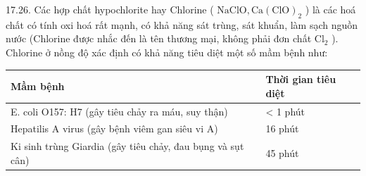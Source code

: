 \documentclass[10pt]{article}
\begin{document}
17.26. Các hợp chất hypochlorite hay Chlorine ( $\mathrm{NaClO}, \mathrm{Ca}(\mathrm{ClO})_{2}$ ) là các hoá chất có tính oxi hoá rất mạnh, có khả năng sát trùng, sát khuẩn, làm sạch nguồn nước (Chlorine được nhắc đến là tên thương mại, không phải đơn chất $\mathrm{Cl}_{2}$ ). Chlorine ở nồng độ xác định có khả năng tiêu diệt một số mầm bệnh như:

\begin{center}
\begin{tabular}{|l|l|}
\hline
Mầm bệnh & Thời gian tiêu diệt \\
\hline
E. coli O157: H7 (gây tiêu chảy ra máu, suy thận) & < 1 phút \\
\hline
Hepatilis A virus (gây bệnh viêm gan siêu vi A) & 16 phút \\
\hline
Ki sinh trùng Giardia (gây tiêu chảy, đau bụng và sụt cân) & 45 phút \\
\hline
\end{tabular}
\end{center}
\end{document}
